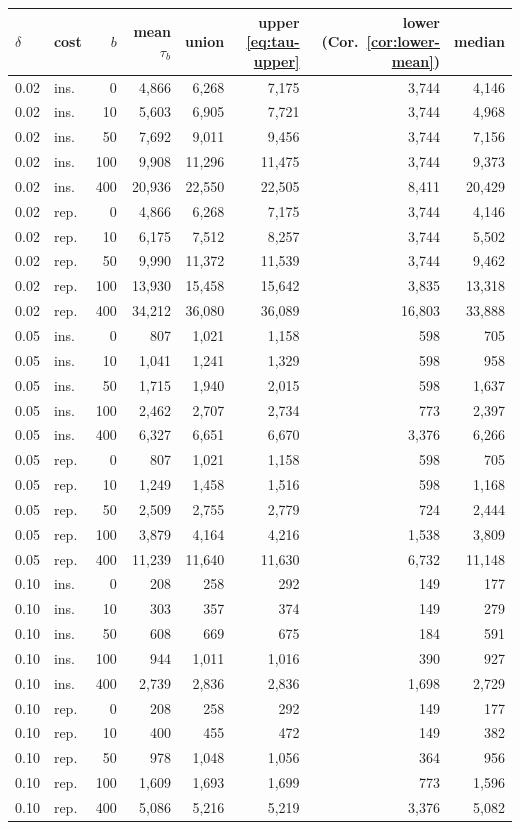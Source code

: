 \begin{tabular}{llrrrrrr}
\toprule
$\delta$ & cost & $b$ & mean $\tau_b$ & union & upper \eqref{eq:tau-upper} & lower (Cor.~\ref{cor:lower-mean}) & median \\
\midrule
0.02 & ins. & 0 & 4,866 & 6,268 & 7,175 & 3,744 & 4,146 \\
0.02 & ins. & 10 & 5,603 & 6,905 & 7,721 & 3,744 & 4,968 \\
0.02 & ins. & 50 & 7,692 & 9,011 & 9,456 & 3,744 & 7,156 \\
0.02 & ins. & 100 & 9,908 & 11,296 & 11,475 & 3,744 & 9,373 \\
0.02 & ins. & 400 & 20,936 & 22,550 & 22,505 & 8,411 & 20,429 \\
0.02 & rep. & 0 & 4,866 & 6,268 & 7,175 & 3,744 & 4,146 \\
0.02 & rep. & 10 & 6,175 & 7,512 & 8,257 & 3,744 & 5,502 \\
0.02 & rep. & 50 & 9,990 & 11,372 & 11,539 & 3,744 & 9,462 \\
0.02 & rep. & 100 & 13,930 & 15,458 & 15,642 & 3,835 & 13,318 \\
0.02 & rep. & 400 & 34,212 & 36,080 & 36,089 & 16,803 & 33,888 \\
0.05 & ins. & 0 & 807 & 1,021 & 1,158 & 598 & 705 \\
0.05 & ins. & 10 & 1,041 & 1,241 & 1,329 & 598 & 958 \\
0.05 & ins. & 50 & 1,715 & 1,940 & 2,015 & 598 & 1,637 \\
0.05 & ins. & 100 & 2,462 & 2,707 & 2,734 & 773 & 2,397 \\
0.05 & ins. & 400 & 6,327 & 6,651 & 6,670 & 3,376 & 6,266 \\
0.05 & rep. & 0 & 807 & 1,021 & 1,158 & 598 & 705 \\
0.05 & rep. & 10 & 1,249 & 1,458 & 1,516 & 598 & 1,168 \\
0.05 & rep. & 50 & 2,509 & 2,755 & 2,779 & 724 & 2,444 \\
0.05 & rep. & 100 & 3,879 & 4,164 & 4,216 & 1,538 & 3,809 \\
0.05 & rep. & 400 & 11,239 & 11,640 & 11,630 & 6,732 & 11,148 \\
0.10 & ins. & 0 & 208 & 258 & 292 & 149 & 177 \\
0.10 & ins. & 10 & 303 & 357 & 374 & 149 & 279 \\
0.10 & ins. & 50 & 608 & 669 & 675 & 184 & 591 \\
0.10 & ins. & 100 & 944 & 1,011 & 1,016 & 390 & 927 \\
0.10 & ins. & 400 & 2,739 & 2,836 & 2,836 & 1,698 & 2,729 \\
0.10 & rep. & 0 & 208 & 258 & 292 & 149 & 177 \\
0.10 & rep. & 10 & 400 & 455 & 472 & 149 & 382 \\
0.10 & rep. & 50 & 978 & 1,048 & 1,056 & 364 & 956 \\
0.10 & rep. & 100 & 1,609 & 1,693 & 1,699 & 773 & 1,596 \\
0.10 & rep. & 400 & 5,086 & 5,216 & 5,219 & 3,376 & 5,082 \\
\bottomrule
\end{tabular}